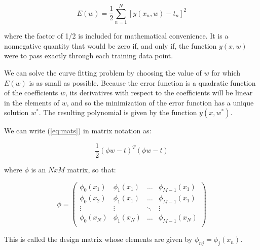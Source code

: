 \begin{Equation}[H]
	\centering
	\begin{equation}\label{eq:mats}
		E(w)=\frac{1}{2} \sum_{n=1}^{N} [y(x_n,w)-t_n]^2
	\end{equation}
\end{Equation}

\noindent where the factor of 1/2 is included for mathematical convenience. It is a nonnegative quantity that would be zero if, and only if, the function $y(x, w)$ were to pass exactly through each training data point.

\noindent We can solve the curve fitting problem by choosing the value of $w$ for which $E(w)$ is as small as possible. Because the error function is a quadratic function of the coefficients $w$, its derivatives with respect to the coefficients will be linear in the elements of $w$, and so the minimization of the error function has a unique solution $w^*$. The resulting polynomial is given by the function $y(x, w^*)$.

\noindent We can  write (\ref{eq:mats}) in matrix notation as:

\begin{Equation}[H]
	\centering
	\begin{equation}
	\frac{1}{2} (\phi w - t)^T (\phi w - t)
	\end{equation}
	\label{eq:mathmodelaada}
\end{Equation}

\noindent where $\phi$ is an $N x M$ matrix, so that:
 

\begin{Equation}[!htb]
	\centering
	\begin{equation}
	\phi =
		\begin{pmatrix}
			\phi_0(x_1) & \phi_1(x_1) & \dots & \phi_{M-1}(x_1) \\
			\phi_0(x_2) & \phi_1(x_1) & \dots & \phi_{M-1}(x_1) \\
			\vdots & \vdots & \ddots & \vdots \\
			\phi_0(x_N) & \phi_1(x_N) & \dots & \phi_{M-1}(x_N) \\
		\end{pmatrix}
	\end{equation}
	\caption[Design matrix.]{This is called the design matrix whose elements are given by $\phi_{nj} = \phi_j(x_n)$.}
	\label{eq:hommatrix}
\end{Equation}

